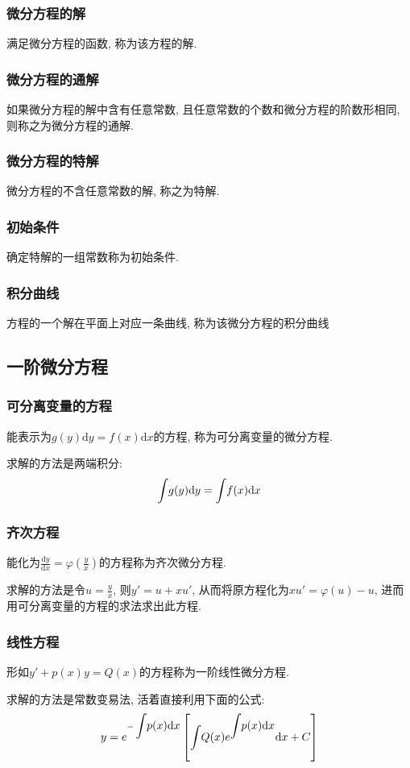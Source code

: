 \subsubsection{微分方程的解}
满足微分方程的函数, 称为该方程的解.
\subsubsection{微分方程的通解}
如果微分方程的解中含有任意常数, 且任意常数的个数和微分方程的阶数形相同, 则称之为微分方程的通解.
\subsubsection{微分方程的特解}
微分方程的不含任意常数的解, 称之为特解.
\subsubsection{初始条件}
确定特解的一组常数称为初始条件.
\subsubsection{积分曲线}
方程的一个解在平面上对应一条曲线, 称为该微分方程的积分曲线
\subsection{一阶微分方程}
\subsubsection{可分离变量的方程}
能表示为$ g(y)\mathrm{d}y=f(x)\mathrm{d}x $的方程, 称为可分离变量的微分方程. \par
求解的方法是两端积分:
\begin{equation*}
    \displaystyle\int_{}\hspace{.2em} g(y)\mathrm{d}y=\displaystyle\int_{}\hspace{.2em}f(x)\mathrm{d}x
\end{equation*}
\subsubsection{齐次方程}
能化为$ \frac{\mathrm{d}y}{\mathrm{d}x}=\varphi(\frac{y}{x}) $的方程称为齐次微分方程.\par
求解的方法是令$ u=\frac{y}{x} $, 则$ y'=u+xu' $, 从而将原方程化为$ xu'=\varphi(u)-u $, 进而用可分离变量的方程的求法求出此方程.
\subsubsection{线性方程}
形如$ y'+p(x)y=Q(x) $的方程称为一阶线性微分方程. \par
求解的方法是常数变易法, 活着直接利用下面的公式:
\begin{equation*}
    y=e^{-\displaystyle\int_{}\hspace{.2em}p(x)\mathrm{d}x}\left[\displaystyle\int_{}\hspace{.2em}Q(x)e^{\displaystyle\int_{}\hspace{.2em}p(x)\mathrm{d}x}\mathrm{d}x+C\right]
\end{equation*}
